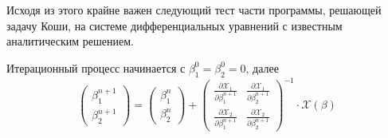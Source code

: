Исходя из этого крайне важен следующий тест части программы, решающей задачу Коши, на системе дифференциальных уравнений с известным аналитическим решением.

Итерационный процесс начинается с $\beta_1^{0} = \beta_2^{0} = 0$, далее
\[
\begin{pmatrix}
\beta_1^{n+1}\\
\beta_2^{n+1}
\end{pmatrix} =
\begin{pmatrix}
\beta_1^{n}\\
\beta_2^{n}
\end{pmatrix} +
\begin{pmatrix}
\frac{\partial \mathcal{X}_1 }{\partial \beta_1^{n+1}} &
\frac{\partial \mathcal{X}_1 }{\partial \beta_2^{n+1}} \\
\frac{\partial \mathcal{X}_2 }{\partial \beta_1^{n+1}} &
\frac{\partial \mathcal{X}_2 }{\partial \beta_2^{n+1}} 
\end{pmatrix}^{-1}
\cdot
\mathcal{X}(\beta)
\]